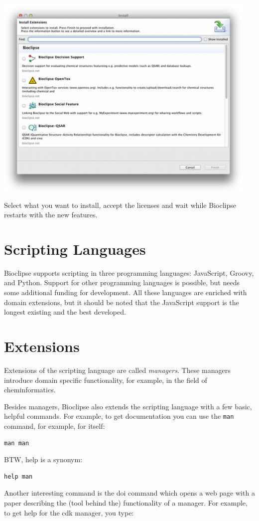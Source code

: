 \documentclass[a5paper, 10pt]{memoir}
\begin{document}
\begin{refsection}
\begin{center}
\includegraphics[width=0.95\textwidth]{images/installFeatures.png}
\end{center}
Select what you want to install, accept the licenses and wait while Bioclipse
restarts with the new features.


\section{Scripting Languages}

Bioclipse supports scripting in three programming languages:
JavaScript, Groovy, and Python.
Support for other programming languages is possible, but needs some additional
funding for development. All these languages are enriched with domain
extensions, but it should be noted that the JavaScript support is the
longest existing and the best developed.

\section{Extensions}

Extensions of the scripting language are called \emph{managers}.
These managers introduce domain specific functionality, for
example, in the field of cheminformatics.

Besides managers, Bioclipse also extends the scripting language with a few
basic, helpful commands. For example, to get documentation you can use the
\texttt{man} command, for example, for itself:
\begin{Verbatim}
man man
\end{Verbatim}
BTW, help is a synonym:
\begin{Verbatim}
help man
\end{Verbatim}
Another interesting command is the doi command which opens a web page with a
paper describing the (tool behind the) functionality of a manager. For example,
to get help for the cdk manager, you type:


\end{refsection}
\end{document}
